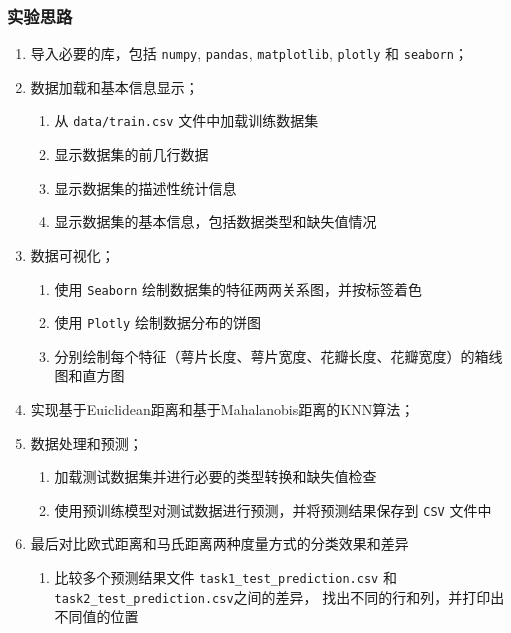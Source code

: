 \documentclass[12pt]{article}
\begin{document}
\subsubsection{实验思路}
\begin{enumerate}
  \item 导入必要的库，包括 \texttt{numpy}, \texttt{pandas}, \texttt{matplotlib}, \texttt{plotly} 和 \texttt{seaborn}；
  \item 数据加载和基本信息显示；
        \begin{enumerate}
          \item 从 \texttt{data/train.csv} 文件中加载训练数据集
          \item 显示数据集的前几行数据
          \item 显示数据集的描述性统计信息
          \item 显示数据集的基本信息，包括数据类型和缺失值情况
        \end{enumerate}
  \item 数据可视化；
        \begin{enumerate}
          \item 使用 \texttt{Seaborn} 绘制数据集的特征两两关系图，并按标签着色
          \item 使用 \texttt{Plotly} 绘制数据分布的饼图
          \item 分别绘制每个特征（萼片长度、萼片宽度、花瓣长度、花瓣宽度）的箱线图和直方图
        \end{enumerate}
  \item 实现基于Euiclidean距离和基于Mahalanobis距离的KNN算法；

  \item 数据处理和预测；
        \begin{enumerate}
          \item 加载测试数据集并进行必要的类型转换和缺失值检查
          \item 使用预训练模型对测试数据进行预测，并将预测结果保存到 \texttt{CSV} 文件中
        \end{enumerate}
  \item 最后对比欧式距离和马氏距离两种度量方式的分类效果和差异
        \begin{enumerate}
          \item 比较多个预测结果文件 \texttt{task1\_test\_prediction.csv} 和\\ \texttt{task2\_test\_prediction.csv}之间的差异，
                找出不同的行和列，并打印出不同值的位置
        \end{enumerate}
\end{enumerate}
\end{document}
